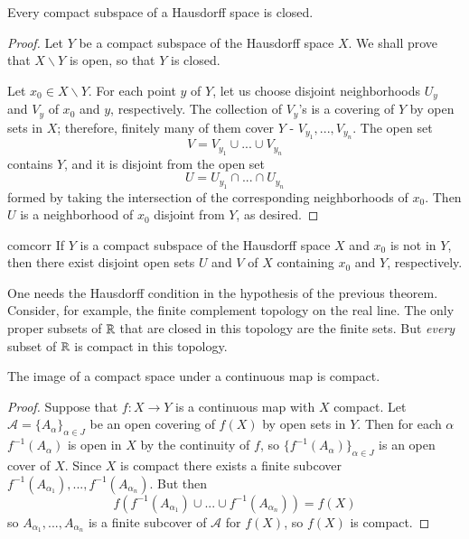 \documentclass[12pt, a4paper, oneside, openright, titlepage]{book}
\begin{document}
\begin{thm}
    Every compact subspace of a Hausdorff space is closed.
\end{thm}
\begin{proof}
    Let $Y$ be a compact subspace of the Hausdorff space $X$. We shall prove that $X\backslash Y$ is open, so that $Y$ is closed.

    Let $x_0 \in X\backslash Y$. For each point $y$ of $Y$, let us choose disjoint neighborhoods $U_y$ and $V_y$ of $x_0$ and $y$, respectively. The collection of $V_y$'s is a covering of $Y$ by open sets in $X$; therefore, finitely many of them cover $Y$ - $V_{y_1},...,V_{y_n}$. The open set \begin{equation*}
        V = V_{y_1}\cup...\cup V_{y_n}
    \end{equation*}
    contains $Y$, and it is disjoint from the open set \begin{equation*}
        U = U_{y_1}\cap ...\cap U_{y_n}
    \end{equation*}
    formed by taking the intersection of the corresponding neighborhoods of $x_0$. Then $U$ is a neighborhood of $x_0$ disjoint from $Y$, as desired.
\end{proof}

\begin{cor}{}{comcorr}
    If $Y$ is a compact subspace of the Hausdorff space $X$ and $x_0$ is not in $Y$, then there exist disjoint open sets $U$ and $V$ of $X$ containing $x_0$ and $Y$, respectively.
\end{cor}

\begin{eg}
    One needs the Hausdorff condition in the hypothesis of the previous theorem. Consider, for example, the finite complement topology on the real line. The only proper subsets of $\mathbb R$ that are closed in this topology are the finite sets. But \emph{every} subset of $\mathbb R$ is compact in this topology.
\end{eg}

\begin{thm}
    The image of a compact space under a continuous map is compact.
\end{thm}
\begin{proof}
    Suppose that $f:X\rightarrow Y$ is a continuous map with $X$ compact. Let $\mathcal{A} = \{A_{\alpha}\}_{\alpha \in J}$ be an open covering of $f(X)$ by open sets in $Y$. Then for each $\alpha$ $f^{-1}(A_{\alpha})$ is open in $X$ by the continuity of $f$, so $\{f^{-1}(A_{\alpha})\}_{\alpha \in J}$ is an open cover of $X$. Since $X$ is compact there exists a finite subcover $f^{-1}(A_{\alpha_1}),...,f^{-1}(A_{\alpha_n})$. But then $$f(f^{-1}(A_{\alpha_1})\cup...\cup f^{-1}(A_{\alpha_n})) = f(X)$$ so $A_{\alpha_1},...,A_{\alpha_n}$ is a finite subcover of $\mathcal{A}$ for $f(X)$, so $f(X)$ is compact.
\end{proof}
\end{document}
